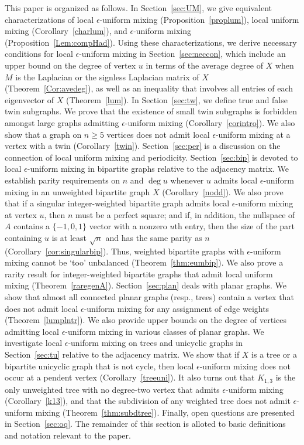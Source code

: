 \documentclass[11pt]{article}
\begin{document}
This paper is organized as follows. In Section~\ref{sec:UM}, we give equivalent characterizations of local $\epsilon$-uniform mixing (Proposition~\ref{proplum}), local uniform mixing (Corollary~\ref{charlum}), and $\epsilon$-uniform mixing (Proposition~\ref{Lem:compHad}). Using these characterizations, we derive necessary conditions for local $\epsilon$-uniform mixing in Section~\ref{sec:neccon}, which include an upper bound on the degree of vertex $u$ in terms of the average degree of $X$ when $M$ is the Laplacian or the signless Laplacian matrix of $X$ (Theorem~\ref{Cor:avedeg}), as well as an inequality that involves all entries of each eigenvector of $X$ (Theorem~\ref{lum}). In Section~\ref{sec:tw}, we define true and false twin subgraphs. We prove that %
the existence of small twin subgraphs is forbidden amongst large graphs admitting $\epsilon$-uniform mixing (Corollary~\ref{corintro}). We also show that a graph on $n\geq 5$ vertices does not admit local $\epsilon$-uniform mixing at a vertex with a twin (Corollary~\ref{twin}). Section~\ref{sec:per} is a discussion on the connection of local uniform mixing and periodicity. Section~\ref{sec:bip} is devoted to local $\epsilon$-uniform mixing in bipartite graphs relative to the adjacency matrix. We establish parity requirements on $n$ and $\operatorname{deg}u$ whenever $u$ admits local $\epsilon$-uniform mixing in an unweighted bipartite graph $X$ (Corollary~\ref{nodd}). We also prove that if a singular integer-weighted bipartite graph admits local $\epsilon$-uniform mixing at vertex $u$, then $n$ must be a perfect square; and if, in addition, the nullspace of $A$ contains a $\{-1,0,1\}$ vector with a nonzero $u$th entry, then the size of the part containing $u$ is at least $\sqrt{n}$ and has the same parity as $n$ (Corollary~\ref{cor:singularbip}). Thus, weighted bipartite graphs with $\epsilon$-uniform mixing cannot be `too' unbalanced (Theorem~\ref{thm:eumbip}). We also prove a rarity result for integer-weighted bipartite graphs that admit local uniform mixing (Theorem~\ref{raregenA}). Section~\ref{sec:plan} deals with planar graphs. We show that almost all connected planar graphs (resp., trees) contain a vertex that does not admit local $\epsilon$-uniform mixing for any assignment of edge weights (Theorem~\ref{lumplntr}). We also provide upper bounds on the degree of vertices admitting local $\epsilon$-uniform mixing in various classes of planar graphs. We investigate local $\epsilon$-uniform mixing on trees and unicyclic graphs in Section~\ref{sec:tu} relative to the adjacency matrix. We show that if $X$ is a tree or a bipartite unicyclic graph that is not cycle, then local $\epsilon$-uniform mixing does not occur at a pendent vertex (Corollary~\ref{treeuni}). It also turns out that $K_{1,3}$ is the only unweighted tree with no degree-two vertex that admits $\epsilon$-uniform mixing (Corollary~\ref{k13}), and that the subdivision of any weighted tree does not admit $\epsilon$-uniform mixing (Theorem~\ref{thm:subdtree}). Finally, open questions are presented in Section~\ref{sec:oq}. The remainder of this section is alloted to basic definitions and notation relevant to the paper.
\end{document}
